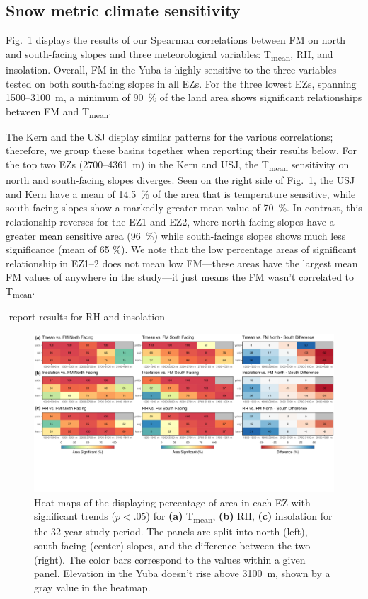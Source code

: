 \hypertarget{ch2-results-3}{\subsection{Snow metric climate sensitivity}\label{ch2-results-3}}

Fig.~\ref{fig:heat_map} displays the results of our Spearman correlations between FM on north and south-facing slopes and three meteorological variables: T\textsubscript{mean}, RH, and insolation. Overall, FM in the Yuba is highly sensitive to the three variables tested on both south-facing slopes in all EZs. For the three lowest EZs, spanning 1500--3100~m, a minimum of 90~\% of the land area shows significant relationships between FM and T\textsubscript{mean}. 

The Kern and the USJ display similar patterns for the various correlations; therefore, we group these basins together when reporting their results below. For the top two EZs (2700--4361~m) in the Kern and USJ, the T\textsubscript{mean} sensitivity on north and south-facing slopes diverges. Seen on the right side of Fig.~\ref{fig:heat_map}, the USJ and Kern have a mean of 14.5~\% of the area that is temperature sensitive, while south-facing slopes show a markedly greater mean value of 70~\%. In contrast, this relationship reverses for the EZ1 and EZ2, where north-facing slopes have a greater mean sensitive area (96~\%) while south-facings slopes shows much less significance (mean of 65 \%). We note that the low percentage areas of significant relationship in EZ1--2 does not mean low FM---these areas have the largest mean FM values of anywhere in the study---it just means the FM wasn't correlated to T\textsubscript{mean}.

-report results for RH and insolation


\begin{figure}[h]
\centering
\includegraphics[width=\textwidth]{figures/ch2_figs/metvars_fm_heatmaps_v4.png}
\caption{Heat maps of the displaying percentage of area in each EZ with significant trends ($p < .05$) for \textbf{(a)} T\textsubscript{mean}, \textbf{(b)} RH, \textbf{(c)} insolation for the 32-year study period. The panels are split into north (left), south-facing (center) slopes, and the difference between the two (right). The color bars correspond to the values within a given panel. Elevation in the Yuba doesn't rise above 3100~m, shown by a gray value in the heatmap.}
\label{fig:heat_map}
\end{figure}




